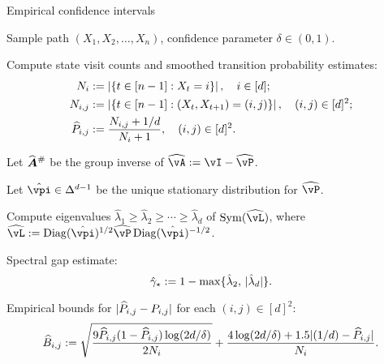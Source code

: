 \begin{algorithm}[t]
\caption{Empirical confidence intervals}
\label{alg:empest}
\begin{algorithmic}[1]
  \renewcommand\algorithmicrequire{\textbf{Input}:}
  \REQUIRE
    Sample path $(X_1,X_2,\dots,X_n)$,
    confidence parameter $\delta \in (0,1)$.

  \STATE Compute state visit counts and smoothed transition
  probability estimates:
  \begin{equation}
    \begin{aligned}
      N_i & :=
      \left|
        \left\{
          t \in [n-1] : X_t = i
        \right\}
      \right|
      , \quad i \in [d] ; \\
      N_{i,j} & :=
      \left|
        \left\{
          t \in [n-1] : (X_t,X_{t+1}) = (i,j)
        \right\}
      \right|
      , \quad (i,j) \in [d]^2 ; \\
      \widehat{P}_{i,j}
      & :=
      \frac{N_{i,j} + 1/d}{N_i + 1}
      , \quad (i,j) \in [d]^2 .
    \end{aligned}
    \notag
  \end{equation}
  \label{step:P}

  \STATE Let $\giAh$ be the group inverse of $\wh\vA := \vI -
  \wh\vP$.
  \label{step:gi}

  \STATE Let $\hat\vpi \in \Delta^{d-1}$ be the unique stationary
  distribution for $\wh\vP$.
  \label{step:pi}

  \STATE Compute eigenvalues $\hat\lambda_1 {\geq} \hat\lambda_2
  {\geq} \dotsb {\geq} \hat\lambda_d$ of $\Sym(\wh\vL)$, where $\wh\vL
  := \Diag(\hat\vpi)^{1/2} \wh\vP \Diag(\hat\vpi)^{-1/2}$.
  \label{step:eig}

  \STATE Spectral gap estimate:
  \[ \hat\gamma_{\star} := 1 - \max\{ \hat\lambda_2,\, |\hat\lambda_d| \} . \]
  \label{step:gap}

  \STATE Empirical bounds for $|\widehat{P}_{i,j}-P_{i,j}|$ for each $(i,j)
  \in [d]^2$:
  \begin{equation}
    \widehat{B}_{i,j}
    :=
    \sqrt{\frac{9\widehat{P}_{i,j}(1-\widehat{P}_{i,j})\log(2d/\delta)}{2N_i}}
    + \frac{4\log(2d/\delta)+1.5|(1/d)-\widehat{P}_{i,j}|}{N_i}
    .
    \notag
  \end{equation}
  \label{step:P-bound}



\end{algorithmic}
\end{algorithm}
